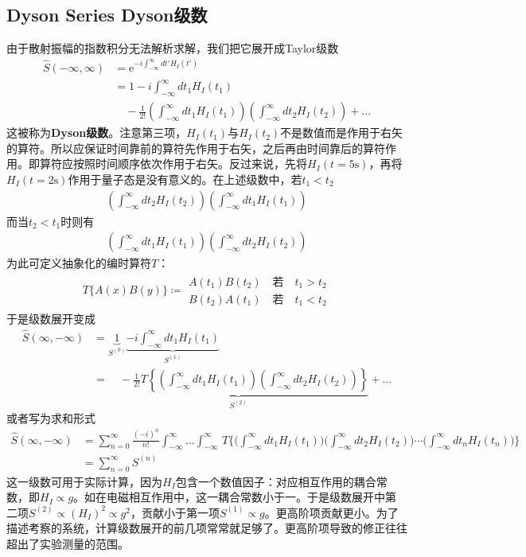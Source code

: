 \subsection[Dyson级数]{Dyson Series \quad Dyson级数}\label{sec9.5.3}
由于散射振幅的指数积分无法解析求解，我们把它展开成Taylor级数
\begin{align}\label{equ9.67}
\hat{S}(-\infty,\infty)&=\text{e}^{-i\int_{-\infty}^\infty dt' H_I(t')}\nonumber\\
&=1-i\int_{-\infty}^\infty dt_1 H_I(t_1)\nonumber\\
&\quad-\frac{1}{2!}\left(\int_{-\infty}^{\infty}dt_1 H_I(t_1)\right)\left(\int_{-\infty}^{\infty}dt_2 H_I(t_2)\right)+\ldots
\end{align}
这被称为{\bf Dyson级数}。注意第三项，$H_I(t_1)$与$H_I(t_2)$不是数值而是作用于右矢的算符。所以应保证时间靠前的算符先作用于右矢，之后再由时间靠后的算符作用。即算符应按照时间顺序依次作用于右矢。反过来说，先将$H_I(t=5\text{s})$，再将$H_I(t=2\text{s})$作用于量子态是没有意义的。在上述级数中，若$t_1<t_2$
\begin{gather*}
\left(\int_{-\infty}^{\infty}dt_2 H_I(t_2)\right)\left(\int_{-\infty}^{\infty}dt_1 H_I(t_1)\right)
\end{gather*}
而当$t_2<t_1$时则有
\begin{gather*}
\left(\int_{-\infty}^{\infty}dt_1 H_I(t_1)\right)\left(\int_{-\infty}^{\infty}dt_2 H_I(t_2)\right)
\end{gather*}
为此可定义抽象化的编时算符$T$：
\begin{align}\label{equ9.68}
T\{A(x)B(y)\}\coloneqq\begin{array}{c}A(t_1)B(t_2)\quad\text{若}\quad t_1>t_2\\B(t_2)A(t_1)\quad\text{若}\quad t_1<t_2\end{array}
\end{align}
于是级数展开变成
\begin{align}\label{equ9.69}
\hat{S}(\infty,-\infty)&=\underbrace{1}_{S^{(0)}}\underbrace{-i\int_{-\infty}^{\infty}dt_1H_I(t_1)}_{S^(1)}\nonumber\\
&=\underbrace{\quad-\frac{1}{2!}T\left\{\left(\int_{-\infty}^{\infty}dt_1 H_I(t_1)\right)\left(\int_{-\infty}^{\infty}dt_2 H_I(t_2)\right)\right\}}_{S^{(2)}}+\ldots
\end{align}
或者写为求和形式
\begin{align}
	\hat{S} (\infty,-\infty) &= \sum_{n=0}^\infty \frac{(-i)^n}{n!} \int_{-\infty}^{\infty} \dots \int_{-\infty}^{\infty}\, T\Bigg\{ \Big( \int_{-\infty}^{\infty} dt_1 H_I(t_1) \Big) \Big( \int_{-\infty}^{\infty} dt_2 H_I(t_2) \Big) \cdots \Big( \int_{-\infty}^{\infty} dt_n H_I(t_n) \Big) \Bigg\}\nonumber\\
	&=\sum_{n=0}^\infty S^{(n)} \label{equ9.70}
\end{align}
这一级数可用于实际计算，因为$H_I$包含一个数值因子：对应相互作用的耦合常数，即$H_I\propto g$。如在电磁相互作用中，这一耦合常数小于一。于是级数展开中第二项$S^{(2)}\propto(H_I)^2\propto g^2$，贡献小于第一项$S^{(1)}\propto g$。更高阶项贡献更小。为了描述考察的系统，计算级数展开的前几项常常就足够了。更高阶项导致的修正往往超出了实验测量的范围。

